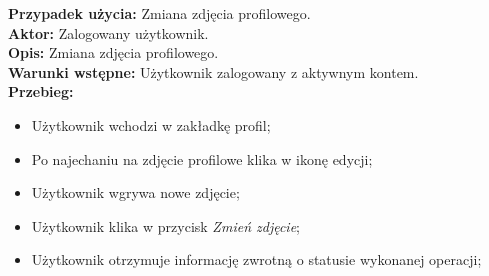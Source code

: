 \noindent
\textbf{Przypadek użycia:} Zmiana zdjęcia profilowego. \\
\textbf{Aktor:} Zalogowany użytkownik. \\
\textbf{Opis:} Zmiana zdjęcia profilowego. \\
\textbf{Warunki wstępne:} Użytkownik zalogowany z aktywnym kontem. \\
\textbf{Przebieg:}
\begin{itemize}
    \item Użytkownik wchodzi w zakładkę profil;
    \item Po najechaniu na zdjęcie profilowe klika w ikonę edycji;
    \item Użytkownik wgrywa nowe zdjęcie;
    \item Użytkownik klika w przycisk \textit{Zmień zdjęcie};
    \item Użytkownik otrzymuje informację zwrotną o statusie wykonanej operacji;
\end{itemize}



